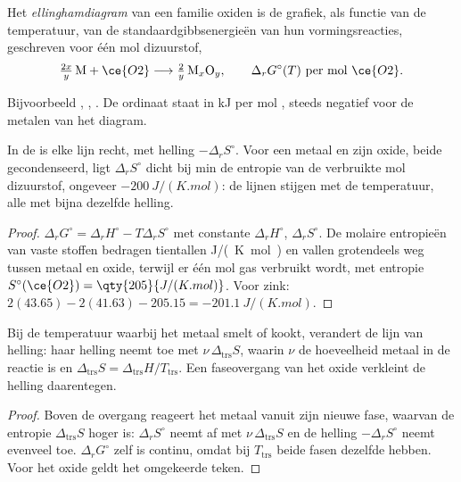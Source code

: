 \begin{definition}[Ellinghamdiagram]\label{def:b2:ellingham:diagram}
Het \emph{ellinghamdiagram} van een familie oxiden
is de grafiek, als functie van de temperatuur, van de standaardgibbsenergieën van hun
vormingsreacties, geschreven voor één mol dizuurstof,
\[
  \tfrac{2x}{y}\,\mathrm M + \ce{O2} \longrightarrow \tfrac{2}{y}\,\mathrm{M}_x\mathrm O_y ,
  \qquad \Delta_r G^\circ(T) \ \text{per mol } \ce{O2} .
\]
\end{definition}

Bijvoorbeeld , , . De ordinaat staat in \unit{kJ} per mol , steeds negatief voor de
metalen van het diagram.

\begin{proposition}\label{prop:b2:ellingham:line}
In de  is elke lijn recht, met helling $-\Delta_r
S^\circ$. Voor een metaal en zijn oxide, beide gecondenseerd, ligt $\Delta_r S^\circ$
dicht bij min de entropie van de verbruikte mol dizuurstof, ongeveer
$-\qty{200}{J/(K.mol)}$: de lijnen stijgen met de temperatuur, alle met bijna
dezelfde helling.
\end{proposition}

\begin{proof}
$\Delta_r G^\circ = \Delta_r H^\circ - T\Delta_r S^\circ$ met constante $\Delta_r
H^\circ$, $\Delta_r S^\circ$. De molaire entropieën van vaste stoffen bedragen tientallen
\unit{J/(K.mol)} en vallen grotendeels weg tussen metaal en oxide, terwijl er één mol
gas verbruikt wordt, met entropie $S^\circ(\ce{O2}) = \qty{205}{J/(K.mol)}$. Voor zink:
$2(43.65) - 2(41.63) - 205.15 = \qty{-201.1}{J/(K.mol)}$.
\end{proof}

\begin{proposition}\label{prop:b2:ellingham:break}
Bij de temperatuur waarbij het metaal smelt of kookt, verandert de lijn van helling:
haar helling neemt toe met $\nu\,\Delta_{\text{trs}}S$, waarin $\nu$ de hoeveelheid
metaal in de reactie is en $\Delta_{\text{trs}}S = \Delta_{\text{trs}}H/T_{\text{trs}}$.
Een faseovergang van het oxide verkleint de helling daarentegen.
\end{proposition}

\begin{proof}
Boven de overgang reageert het metaal vanuit zijn nieuwe fase, waarvan de entropie
$\Delta_{\text{trs}}S$ hoger is: $\Delta_r S^\circ$ neemt af met $\nu\,\Delta_{\text{trs}}S$
en de helling $-\Delta_r S^\circ$ neemt evenveel toe. $\Delta_r G^\circ$
zelf is continu, omdat bij $T_{\text{trs}}$ beide fasen dezelfde
 hebben. Voor het oxide geldt het omgekeerde teken.
\end{proof}

